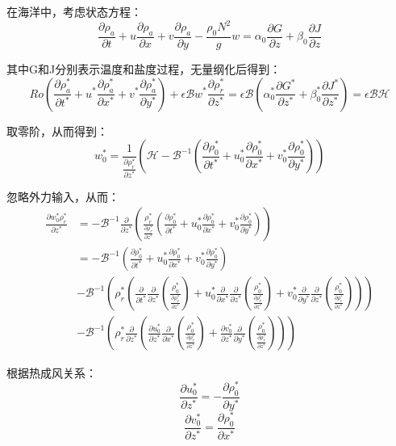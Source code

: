 \documentclass{article}
\begin{document}
在海洋中，考虑状态方程：
$$\frac{\partial \rho_a}{\partial t} 
+ u\frac{\partial \rho_a}{\partial x}
+ v\frac{\partial \rho_a}{\partial y}
- \frac{\rho_0N^2}{g}w = 
\alpha_0\frac{\partial G}{\partial z}
+\beta_0\frac{\partial J}{\partial z}$$

其中G和J分别表示温度和盐度过程，无量纲化后得到：
$$Ro(\frac{\partial \rho_a^*}{\partial t^*} 
+ u^*\frac{\partial \rho_a^*}{\partial x^*}
+ v^*\frac{\partial \rho_a^*}{\partial y^*})
+ \epsilon\mathcal{B}w^* \frac{\partial \rho_r^*}{\partial z^*} = 
\epsilon\mathcal{B}(\alpha_0^*\frac{\partial G^*}{\partial z^*}
+\beta_0^*\frac{\partial J^*}{\partial z^*}) = \epsilon\mathcal{B}\mathcal{H}$$

取零阶，从而得到：
$$w_0^* = \frac{1}{\frac{\partial \rho_r^*}{\partial z^*}}
(\mathcal{H}-\mathcal{B}^{-1}(\frac{\partial \rho_0^*}{\partial t^*} 
+ u_0^*\frac{\partial \rho_0^*}{\partial x^*}
+ v_0^*\frac{\partial \rho_0^*}{\partial y^*}))$$

忽略外力输入，从而：
\begin{align}
\frac{\partial w_0^*\rho_r^*}{\partial z^*}
&=-\mathcal{B}^{-1}\frac{\partial}{\partial z^*}
\left( \frac{\rho_r^*}{\frac{\partial \rho_r^*}{\partial z^*}}
(\frac{\partial \rho_0^*}{\partial t^*} 
+ u_0^*\frac{\partial \rho_0^*}{\partial x^*}
+ v_0^*\frac{\partial \rho_0^*}{\partial y^*})\right)\\
&= -\mathcal{B}^{-1}(\frac{\partial \rho_0^*}{\partial t^*} 
+ u_0^*\frac{\partial \rho_0^*}{\partial x^*}
+ v_0^*\frac{\partial \rho_0^*}{\partial y^*})\\
&-\mathcal{B}^{-1}(\rho_r^*
(\frac{\partial }{\partial t^*}\frac{\partial}{\partial z^*}(\frac{\rho_0^*}{\frac{\partial \rho_r^*}{\partial z^*}})
+ u_0^*\frac{\partial }{\partial x^*}\frac{\partial}{\partial z^*}(\frac{\rho_0^*}{\frac{\partial \rho_r^*}{\partial z^*}})
+ v_0^*\frac{\partial }{\partial y^*}\frac{\partial}{\partial z^*}(\frac{\rho_0^*}{\frac{\partial \rho_r^*}{\partial z^*}})))\\
& - \mathcal{B}^{-1}(\rho_r^*\frac{\partial}{\partial z^*}
( \frac{\partial u_0^*}{\partial z^*}\frac{\partial }{\partial x^*}(\frac{\rho_0^*}{\frac{\partial \rho_r^*}{\partial z^*}})
+ \frac{\partial v_0^*}{\partial z^*}\frac{\partial }{\partial y^*}(\frac{\rho_0^*}{\frac{\partial \rho_r^*}{\partial z^*}})))
\end{align}

根据热成风关系：
$$\frac{\partial u_0^*}{\partial z^*} 
= -\frac{\partial \rho_0^*}{\partial y^*}$$
$$\frac{\partial v_0^*}{\partial z^*} 
= \frac{\partial \rho_0^*}{\partial x^*}$$
\end{document}
